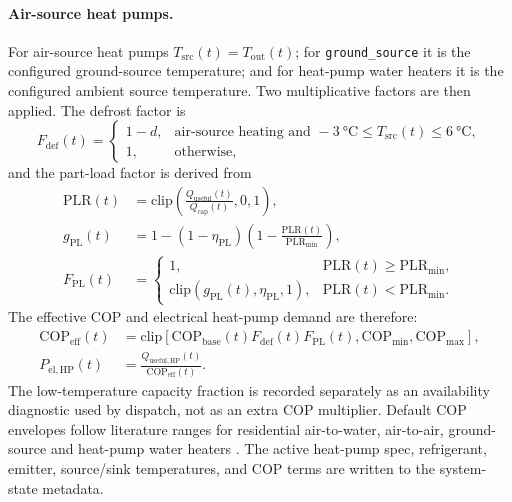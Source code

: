 \paragraph{Air-source heat pumps.}
For air-source heat pumps $T_{\mathrm{src}}(t)=T_{\mathrm{out}}(t)$; for \texttt{ground\_source} it is the configured ground-source temperature; and for heat-pump water heaters it is the configured ambient source temperature.
\newline Two multiplicative factors are then applied. The defrost factor is
\begin{equation}
  F_{\mathrm{def}}(t)
  =
  \begin{cases}
    1-d, & \text{air-source heating and } -\SI{3}{\celsius}
      \le T_{\mathrm{src}}(t) \le \SI{6}{\celsius},\\
    1, & \text{otherwise},
  \end{cases}
  \label{eq:hp_defrost}
\end{equation}
and the part-load factor is derived from
\begin{equation}
\begin{aligned}
  \mathrm{PLR}(t)
  &= \mathrm{clip}\!\left(\frac{Q_{\mathrm{useful}}(t)}
                                {Q_{\mathrm{cap}}(t)},0,1\right),\\
  g_{\mathrm{PL}}(t)
  &= 1-(1-\eta_{\mathrm{PL}})
      \left(1-\frac{\mathrm{PLR}(t)}{\mathrm{PLR}_{\min}}\right),\\
  F_{\mathrm{PL}}(t)
  &=
  \begin{cases}
    1, & \mathrm{PLR}(t) \ge \mathrm{PLR}_{\min},\\
    \mathrm{clip}\!\left(g_{\mathrm{PL}}(t),\eta_{\mathrm{PL}},1\right),
      & \mathrm{PLR}(t) < \mathrm{PLR}_{\min}.
  \end{cases}
\end{aligned}
  \label{eq:hp_part_load}
\end{equation}
The effective COP and electrical heat-pump demand are therefore:
\begin{equation}
\begin{aligned}
  \mathrm{COP}_{\mathrm{eff}}(t)
  &= \mathrm{clip}\!\left[
      \mathrm{COP}_{\mathrm{base}}(t)
      F_{\mathrm{def}}(t)F_{\mathrm{PL}}(t),
      \mathrm{COP}_{\min}, \mathrm{COP}_{\max}
    \right],\\
  P_{\mathrm{el,HP}}(t)
  &= \frac{Q_{\mathrm{useful,HP}}(t)}
         {\mathrm{COP}_{\mathrm{eff}}(t)}.
\end{aligned}
  \label{eq:hp_effective_cop}
\end{equation}
The low-temperature capacity fraction is recorded separately as an availability diagnostic used by dispatch, not as an extra COP multiplier. Default COP envelopes follow literature ranges for residential air-to-water, air-to-air, ground-source and heat-pump water heaters \cite{KULeuvenHP2015,Stafford2017HPField}. The active heat-pump spec, refrigerant, emitter, source/sink temperatures, and COP terms are written to the system-state metadata.

